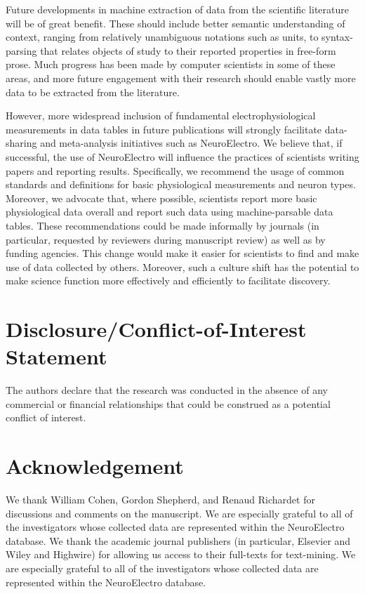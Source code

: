 \documentclass{template/frontiersSCNS} %
\begin{document}
Future developments in machine extraction of data from the scientific literature will be of great benefit.  
These should include better semantic understanding of context, ranging from relatively unambiguous notations such as units, to syntax-parsing that relates objects of study to their reported properties in free-form prose.  
Much progress has been made by computer scientists in some of these areas, and more future engagement with their research should enable vastly more data to be extracted from the literature.  

However, more widespread inclusion of fundamental electrophysiological measurements in data tables in future publications will strongly facilitate data-sharing and meta-analysis initiatives such as NeuroElectro.  
We believe that, if successful, the use of NeuroElectro will influence the practices of scientists writing papers and reporting results.  
Specifically, we recommend the usage of common standards and definitions for basic physiological measurements\citep{toledo-rodriguez_correlation_2004} and neuron types\citep{ascoli_petilla_2008,larson_neurolex.org:_2013}.  
Moreover, we advocate that, where possible, scientists report more basic physiological data overall and report such data using machine-parsable data tables.  
These recommendations could be made informally by journals (in particular, requested by reviewers during manuscript review) as well as by funding agencies.
This change would make it easier for scientists to find and make use of data collected by others.  
Moreover, such a culture shift has the potential to make science function more effectively and efficiently to facilitate discovery.   

\section*{Disclosure/Conflict-of-Interest Statement}
The authors declare that the research was conducted in the absence of any commercial or financial relationships that could be construed as a potential conflict of interest.

\section*{Acknowledgement}
We thank William Cohen, Gordon Shepherd, and Renaud Richardet for discussions and comments on the manuscript. 
We are especially grateful to all of the investigators whose collected data are represented within the NeuroElectro database.  
We thank the academic journal publishers (in particular, Elsevier and Wiley and Highwire) for allowing us access to their full-texts for text-mining.  
We are especially grateful to all of the investigators whose collected data are represented within the NeuroElectro database.
\end{document}
